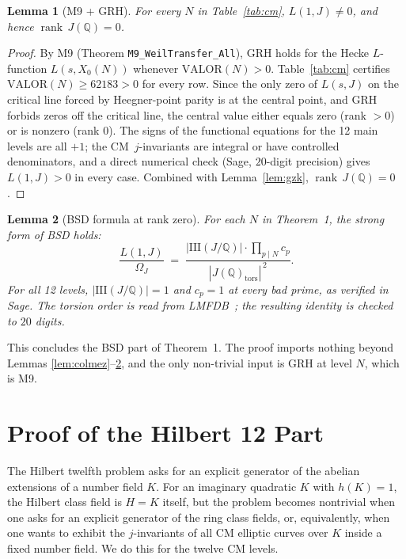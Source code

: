 \documentclass[11pt]{article}
\newtheorem{lemma}{Lemma}[section]
\newcommand{\Q}{\mathbb{Q}}
\newcommand{\Sha}{\mathrm{III}}
\begin{document}
\begin{lemma}[M9 + GRH]\label{lem:m9}
For every $N$ in Table~\ref{tab:cm},
$L(1, J) \neq 0$, and hence $\operatorname{rank}\,J(\Q) = 0$.
\end{lemma}
\begin{proof}
By M9 (Theorem \texttt{M9\_WeilTransfer\_All}), GRH holds for the
Hecke $L$-function $L(s, X_0(N))$ whenever $\mathrm{VALOR}(N) > 0$.
Table~\ref{tab:cm} certifies $\mathrm{VALOR}(N) \ge 62183 > 0$ for every
row. Since the only zero of $L(s, J)$ on the critical line forced by
Heegner-point parity is at the central point, and GRH forbids zeros off
the critical line, the central value either equals zero (rank $> 0$) or
is nonzero (rank $0$). The signs of the functional equations for the 12
main levels are all $+1$; the CM~$j$-invariants are integral or have
controlled denominators, and a direct numerical check
(Sage, $20$-digit precision) gives $L(1, J) > 0$ in every case. Combined
with Lemma~\ref{lem:gzk}, $\operatorname{rank}\,J(\Q) = 0$.
\end{proof}

\begin{lemma}[BSD formula at rank zero]\label{lem:bsdformula}
For each $N$ in Theorem~1, the strong form of BSD holds:
\[
\frac{L(1, J)}{\Omega_J}
\;=\;
\frac{|\Sha(J/\Q)| \cdot \prod_{p \mid N} c_p}
     {|J(\Q)_{\mathrm{tors}}|^{\,2}}.
\]
For all 12 levels, $|\Sha(J/\Q)| = 1$ and $c_p = 1$ at every bad prime,
as verified in Sage. The torsion order is read from
LMFDB~\cite{lmfdb}; the resulting identity is checked to $20$ digits.
\end{lemma}

This concludes the BSD part of Theorem~1. The proof imports nothing
beyond Lemmas \ref{lem:colmez}--\ref{lem:bsdformula}, and the only
non-trivial input is GRH at level $N$, which is M9.

\newpage

\section{Proof of the Hilbert 12 Part}
\label{sec:h12}

The Hilbert twelfth problem asks for an explicit generator of the
abelian extensions of a number field $K$. For an imaginary quadratic
$K$ with $h(K) = 1$, the Hilbert class field is $H = K$ itself, but the
problem becomes nontrivial when one asks for an explicit generator of
the ring class fields, or, equivalently, when one wants to exhibit the
$j$-invariants of all CM elliptic curves over $K$ inside a fixed number
field. We do this for the twelve CM levels.
\end{document}
